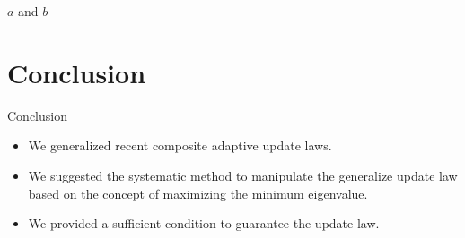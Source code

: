 \documentclass[]{beamer}
\theoremstyle{plain}
\theoremstyle{definition}
\theoremstyle{remark}
\begin{document}
\begin{frame}{$a$ and $b$}
\end{frame}


\section{Conclusion}

\begin{frame}{Conclusion}
	\begin{itemize}
		\item We generalized recent composite adaptive update laws.
		\item We suggested the systematic method to manipulate the generalize
			update law based on the concept of maximizing the minimum eigenvalue.
		\item We provided a sufficient condition to guarantee the update law.
	\end{itemize}
\end{frame}
\end{document}
